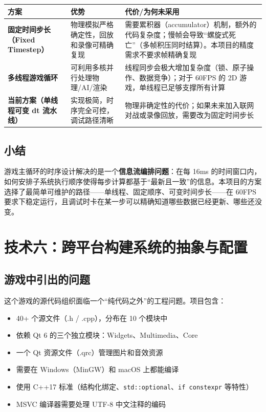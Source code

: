 \documentclass[utf8]{ctexart}
\begin{document}
\begin{longtable}{p{}p{}p{}}
\toprule
\textbf{方案} & \textbf{优势} & \textbf{代价/为何未采用} \\
\midrule
\textbf{固定时间步长（Fixed Timestep）} & 物理模拟严格确定性，回放和录像可精确复现 & 需要累积器（accumulator）机制，额外的代码复杂度；慢帧会导致“螺旋式死亡”（多帧积压同时结算）。本项目的精度需求不要求帧精确复现 \\
\hline
\textbf{多线程游戏循环} & 可利用多核并行处理物理/AI/渲染 & 线程同步会极大增加复杂度（锁、原子操作、数据竞争）；对于 60FPS 的 2D 游戏，单线程已足够支撑所有计算 \\
\hline
\textbf{当前方案（单线程可变 dt 流水线）} & 实现极简，时序完全可控，调试路径清晰 & 物理非确定性的代价；如果未来加入联网对战或录像回放，需要改为固定时间步长 \\
\bottomrule
\end{longtable}

\subsection{小结}

游戏主循环的时序设计解决的是一个\textbf{信息流编排问题}：在每 16ms 的时间窗口内，如何安排子系统执行顺序使得每步计算都基于“最新且一致”的信息。本项目的方案选择了最简单可维护的路径——单线程、固定顺序、可变时间步长——在 60FPS 要求下稳定运行，且调试时卡在某一步可以精确知道哪些数据已经更新、哪些还没变。

\newpage

\section{技术六：跨平台构建系统的抽象与配置}

\subsection{游戏中引出的问题}

这个游戏的源代码组织面临一个“纯代码之外”的工程问题。项目包含：

\begin{itemize}
  \item 40+ 个源文件（.h / .cpp），分布在 10 个模块中
  \item 依赖 Qt 6 的三个独立模块：Widgets、Multimedia、Core
  \item 一个 Qt 资源文件（.qrc）管理图片和音效资源
  \item 需要在 Windows（MinGW）和 macOS 上都能编译
  \item 使用 C++17 标准（结构化绑定、\texttt{std::optional}、\texttt{if constexpr} 等特性）
  \item MSVC 编译器需要处理 UTF-8 中文注释的编码
\end{itemize}
\end{document}
